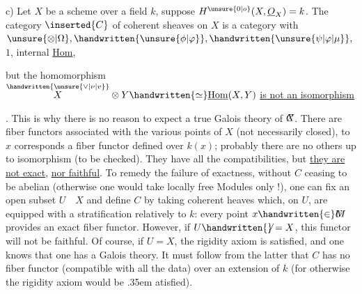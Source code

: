 
c) Let $X$ be a  scheme over a field $k$, suppose $H^{\unsure{0|o}}(X,\underline{O}_{X})=k$. The category $\inserted{C}$ of coherent sheaves on $X$ is a category with $\unsure{\otimes|\Omega},\handwritten{\unsure{\phi|\varphi}},\handwritten{\unsure{\psi|\varphi|\mu}},$  $1$, internal \uline{Hom},  but the homomorphism $\overset{\handwritten{\unsure{\vee|\nu|v}}}{X}\otimes Y\handwritten{\simeq}\underline{\mathrm{Hom}}(X,Y)$ \uline{is not an isomorphism}. This is why there is no reason to expect a true Galois theory of $\rlap{\(X\)}C$. There are fiber functors associated with the various points of $X$ (not necessarily closed), to $x$ corresponds a fiber functor defined over $k(x)$; probably there are no others up to isomorphism (to be checked). They have all the compatibilities, but \uline{they are not exact},  \uline{nor faithful}. To remedy the failure of exactness, without $C$ ceasing to be abelian (otherwise one would take locally free Modules only !), one can fix an open subset $U\quad X$ and define $C$ by taking coherent heaves which, on $U$, are equipped with a stratification relatively to $k$: every point $x\handwritten{\in}\rlap{\(M\)}U$ provides an exact fiber functor. However, if $U\handwritten{\not}=X$, this functor will not be faithful. Of course, if $U=X$, the rigidity axiom is satisfied, and one knows that one has a Galois theory. It must follow from the latter that $C$ has no fiber functor (compatible with all the data) over an extension of $k$ (for otherwise the rigidity axiom would be \kern.35em atisfied).

